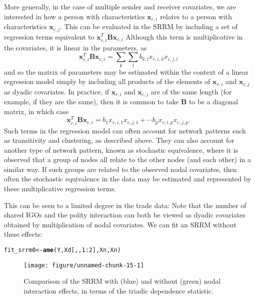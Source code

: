 \documentclass[11pt]{article}\usepackage[]{graphicx}\usepackage[]{color}
\makeatletter
\def\maxwidth{ %
  \ifdim\Gin@nat@width>\linewidth
    \linewidth
  \else
    \Gin@nat@width
  \fi
}
\newcommand{\hlnum}[1]{\textcolor[rgb]{0.686,0.059,0.569}{#1}}%
\newcommand{\hlopt}[1]{\textcolor[rgb]{0,0,0}{#1}}%
\newcommand{\hlstd}[1]{\textcolor[rgb]{0.345,0.345,0.345}{#1}}%
\newcommand{\hlkwb}[1]{\textcolor[rgb]{0.69,0.353,0.396}{#1}}%
\newcommand{\hlkwd}[1]{\textcolor[rgb]{0.737,0.353,0.396}{\textbf{#1}}}%
\newenvironment{kframe}{%
 \def\at@end@of@kframe{}%
 \ifinner\ifhmode%
  \def\at@end@of@kframe{\end{minipage}}%
  \begin{minipage}{\columnwidth}%
 \fi\fi%
 \def\FrameCommand##1{\hskip\@totalleftmargin \hskip-\fboxsep
 \colorbox{shadecolor}{##1}\hskip-\fboxsep
     \hskip-\linewidth \hskip-\@totalleftmargin \hskip\columnwidth}%
 \MakeFramed {\advance\hsize-\width
   \@totalleftmargin\z@ \linewidth\hsize
   \@setminipage}}%
 {\par\unskip\endMakeFramed%
 \at@end@of@kframe}
\newenvironment{knitrout}{}{} %
\newcommand{\bl}[1]{{\mathbf #1}}
\makeatother
\begin{document}
More generally, in the case of multiple sender and 
receiver covariates, 
we are interested in how a person with characteristics 
$\bl x_{r,i}$ relates to a person with characteristics 
$\bl x_{c,j}$. 
This can be evaluated in the SRRM by including a set of regression 
terms equivalent to 
$\bl x_{r,i}^T \bl B \bl x_{c,i}$
Although this term is multiplicative in the 
covariates, it is linear in the parameters, as 
\[ 
 \bl x_{r,i}^T \bl B \bl x_{c,i} = \sum_{k} \sum_l b_{k,l} x_{r,i,k} x_{c,j,l} 
\] 
and so the 
matrix of parameters may be estimated within the context of 
a linear regression model simply by including 
all products of the elements of $\bl x_{r,i}$ and $\bl x_{c,j}$ as 
dyadic covariates. In practice, 
if $\bl x_{r,i}$ and $\bl x_{c,j}$ are of the same length
(for example, if they are the same), 
then  it is 
common to take $\bl B$  to be a diagonal matrix, in which case  
\[ 
  \bl x_{r,i}^T \bl B \bl x_{c,i} = b_1 x_{r,i,1} x_{c,j,1}  + \cdots 
    b_p x_{r,i,p} x_{c,j,p}. 
\] 
Such terms in the regression model can often account 
for network patterns such as transitivity and clustering, 
as described above. 
They can also account for another type of network pattern, 
known as stochastic equivalence, where it is 
observed that a group of nodes 
all relate to the other nodes (and each other) in a similar way. 
If such groups are related to the observed nodal covariates, then often 
the stochastic equivalence in the data  may be estimated and represented by 
these multiplicative regression terms. 

This can be seen to a limited degree in the trade data: 
Note that the number of shared IGOs and the polity interaction can both 
be viewed as dyadic covariates obtained by multiplication of 
nodal covariates. We can fit an SRRM without these effects:
\begin{knitrout}\footnotesize
{}\color{fgcolor}\begin{kframe}
\begin{alltt}
\hlstd{fit_srrm0}\hlkwb{<-}\hlkwd{ame}\hlstd{(Y,Xd[,,}\hlnum{1}\hlopt{:}\hlnum{2}\hlstd{],Xn,Xn)}
\end{alltt}
\end{kframe}
\end{knitrout}

\begin{figure}
\begin{knitrout}\footnotesize
{}\color{fgcolor}
\texttt{[image: figure/unnamed-chunk-15-1]} 

\end{knitrout}
\caption{Comparison of the SRRM with (blue) and without (green) nodal 
interaction effects, in terms of the triadic dependence statistic.}  
\label{fig:mdcomp}
\end{figure}
\end{document}
